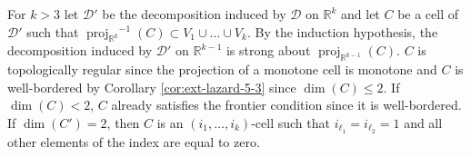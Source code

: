 \documentclass[
]{book}
\theoremstyle{definition}
\theoremstyle{definition}
\theoremstyle{definition}
\theoremstyle{definition}
\theoremstyle{remark}
\begin{document}
For \(k>3\) let \(\mathcal{D'}\) be the decomposition induced by \(\mathcal{D}\) on \(\mathbb{R}^k\) and let \(C\) be a cell of \(\mathcal{D'}\) such that \({\operatorname{proj}_{\mathbb{R}^{k}}}^{-1}(C) \subset V_1 \cup \ldots \cup V_k\).
By the induction hypothesis, the decomposition induced by \(\mathcal{D'}\) on \(\mathbb{R}^{k-1}\) is strong about \({\operatorname{proj}_{\mathbb{R}^{k-1}}}(C)\).
\(C\) is topologically regular since the projection of a monotone cell is monotone and \(C\) is well-bordered by Corollary \ref{cor:ext-lazard-5-3} since \(\dim(C) \le 2\).
If \(\dim(C) < 2\), \(C\) already satisfies the frontier condition since it is well-bordered.
If \(\dim(C') = 2\), then \(C\) is an \((i_1,\ldots,i_k)\)-cell such that \(i_{\ell_1} = i_{\ell_2} = 1\) and all other elements of the index are equal to zero.
\end{document}
